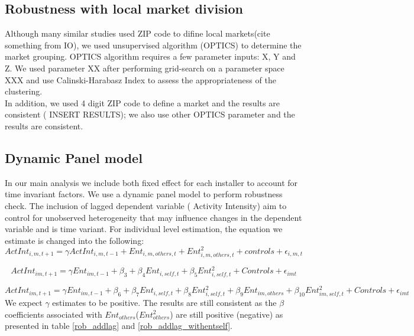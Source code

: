 \documentclass[msom,blindrev]{informs3}
\begin{document}
\subsection{Robustness with local market division}
Although many similar studies used ZIP code to difine local markets(cite something from IO), we used unsupervised algorithm (OPTICS) to determine the market grouping. OPTICS algorithm requires a few parameter inputs: X, Y and Z. We used parameter XX after performing grid-search on a parameter space XXX and use Calinski-Harabasz Index to assess the appropriateness of the clustering.  \\ In addition, we used 4 digit ZIP code to define a market and the results are consistent ( INSERT RESULTS); we also use other OPTICS parameter and the results are consistent.  \\

\subsection{Dynamic Panel model}
In our main analysis we include both fixed effect for each installer to account for time invariant factors. We use a dynamic panel model to perform robustness check. The inclusion of lagged dependent variable ( Activity Intensity) aim to control for unobserved heterogeneity that may influence changes in the dependent variable and is time variant. For individual level estimation, the equation we estimate is changed into the following:
\begin{equation}
    ActInt_{i,m,t+1}=\gamma ActInt_{i,m,t-1}+Ent_{i,m,others,t}+Ent_{i,m,others,t}^2+
    controls+\epsilon_{i,m,t}
\end{equation}

\begin{equation}
    ActInt_{im,t+1}=\gamma Ent_{im,t-1}+\beta_{3}+\beta_{4} Ent_{i,self,t}+\beta_{5}Ent_{i,self,t}^2+
   Controls+\epsilon_{imt}
   \label{model_ind_dyn_1}
\end{equation}

\begin{equation}
    ActInt_{im,t+1}=\gamma Ent_{im,t-1}+\beta_{6}+\beta_{7} Ent_{i,self,t}+\beta_{8}Ent_{i,self,t}^2+\beta_{9}Ent_{im,others}+\beta_{10}Ent_{im,self,t}^2+
   Controls+\epsilon_{imt}
   \label{model_ind_dyn_2}
\end{equation}
We expect $\gamma$ estimates to be positive. The results are still consistent as the $\beta$ coefficients associated with $Ent_{others}$($Ent_{others}^2$) are still positive (negative) as presented in table \ref{rob_addlag} and \ref{rob_addlag_withentself}.
\end{document}
